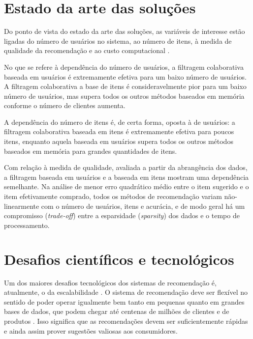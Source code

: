 \section{Estado da arte das soluções} %
\label{sec:estado_da_arte_das_solu_es}

Do ponto de vista do estado da arte das soluções, as variáveis de interesse estão ligadas do número de usuários no sistema, ao número de itens, à medida de qualidade da recomendação e ao custo computacional \cite{lee2012comparative}.

No que se refere à dependência do número de usuários, a filtragem colaborativa baseada em usuários é extremamente efetiva para um baixo número de usuários. A filtragem colaborativa a base de itens é consideravelmente pior para um baixo número de usuários, mas supera todos os outros métodos baseados em memória conforme o número de clientes aumenta.

A dependência do número de itens é, de certa forma, oposta à de usuários: a filtragem colaborativa baseada em itens é extremamente efetiva para poucos itens, enquanto aquela baseada em usuários supera todos os outros métodos baseados em memória para grandes quantidades de itens.

Com relação à medida de qualidade, avaliada a partir da abrangência dos dados, a filtragem baseada em usuários e a baseada em itens mostram uma dependência semelhante. Na análise de menor erro quadrático médio entre o item sugerido e o item efetivamente comprado, todos os métodos de recomendação variam não-linearmente com o número de usuários, itens e acurácia, e de modo geral há um compromisso (\textit{trade-off}) entre a esparsidade (\textit{sparsity}) dos dados e o tempo de processamento. 

\section{Desafios científicos e tecnológicos} %
\label{sec:desafios_cient_ficos_e_tecnol_gicos}

Um dos maiores desafios tecnológicos dos sistemas de recomendação é, atualmente, o da escalabilidade \cite{wei2007survey}. O sistema de recomendação deve ser flexível no sentido de poder operar igualmente bem tanto em pequenas quanto em grandes bases de dados, que podem chegar até centenas de milhões de clientes \cite{amazoncustomers} e de produtos \cite{amazonproducts}. Isso significa que as recomendações devem ser suficientemente rápidas e ainda assim prover sugestões valiosas aos consumidores. 

